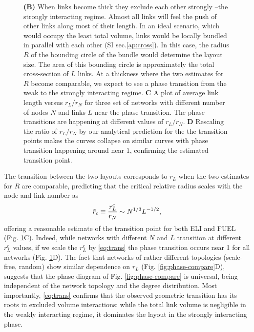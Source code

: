 \documentclass[nofootinbib,preprint,floatfix,titlepage,superscriptaddress]{revtex4} %
\begin{document}
{\begin{figure}
{    {\bf (B)} When links become thick they exclude each other strongly --the strongly interacting regime. 
    Almost all links will feel the push of other links along most of their length. 
    In an ideal scenario, which would occupy the least total volume, links would be locally bundled in parallel with each other (SI sec.\ref{ap:cross}). 
    In this case, the radius $R$ of the bounding circle of the bundle would determine the layout size.
    The area of this bounding circle is approximately the total cross-section of $L$ links. 
    At a thickness where the two estimates for $R$ become comparable, we expect to see a phase transition from the weak to the strongly interacting regime. 
    {\bf C} A plot of average link length versus $r_L/r_N$ for three set of networks with different number of nodes $N$ and links $L$ near the phase transition. The phase transitions are happening at different values of $r_L/r_N$. 
    {\bf D} Rescaling the ratio of $r_L/r_N$ by our analytical prediction for the the transition points makes the curves collapse on similar curves with phase transition happening around near $1$, confirming the estimated transition point. }
    \label{fig:trans}
\end{figure}
}%
The transition between the two layouts corresponds to   $r_L$ when the two estimates for $R$ are comparable, predicting that the critical relative radius  scales with the node and link number as
\begin{equation}
    \tilde{r}_c \equiv {r^c_L\over r_N} \sim N^{1/3} L^{-1/2}, \label{eq:trans}
\end{equation}
offering a reasonable estimate of the transition point for both ELI and FUEL 
(Fig. \ref{fig:trans}C).  
Indeed, while networks with different $N$ and $L$ transition at different $r_L^c$ values, if we scale the $r_L^c$ by \eqref{eq:trans} the phase transition occurs near 1 for all networks (Fig. \ref{fig:trans}D).   
The fact that networks of rather different topologies (scale-free, random) show similar dependence on $r_L$ (Fig. \ref{fig:phase-compare}D), 
suggests that the phase diagram of Fig. \ref{fig:phase-compare} is universal, being independent of the network topology and the degree distribution. 
Most importantly, \eqref{eq:trans} confirms that the observed geometric transition has its roots in excluded volume interactions: while the total link volume is negligible in the weakly interacting regime, it dominates the layout in the strongly interacting phase. 
\end{document}
